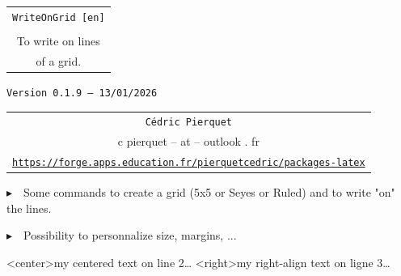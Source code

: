\documentclass[a4paper]{article}
\def\TPversion{0.1.9}
\def\TPdate{13/01/2026}
\begin{document}
\pagestyle{fancy}

\thispagestyle{empty}

\vspace{2cm}

\begin{center}
	\begin{minipage}{0.75\linewidth}
	\begin{tcolorbox}[colframe=yellow,colback=yellow!15]
		\begin{center}
			\begin{tabular}{c}
				{\Huge \texttt{WriteOnGrid [en]}}\\
				\\
				{\LARGE To write on lines} \\
				{\LARGE of a grid.}
			\end{tabular}
			
			\medskip
			
			{\small \texttt{Version \TPversion{} -- \TPdate}}
		\end{center}
	\end{tcolorbox}
\end{minipage}
\end{center}

\vspace{0.5cm}

\begin{center}
	\begin{tabular}{c}
	\texttt{Cédric Pierquet}\\
	{\ttfamily c pierquet -- at -- outlook . fr}\\
	\texttt{\url{https://forge.apps.education.fr/pierquetcedric/packages-latex}}
\end{tabular}
\end{center}

\vspace{0.5cm}

{$\blacktriangleright$~~Some commands to create a grid (5x5 or Seyes or Ruled) and to write "on" the lines.}

\smallskip

{$\blacktriangleright$~~Possibility to personnalize size, margins, ...}

\vspace{1cm}

\begin{center}
	\begin{EnvGrid}[NumSquares=22x8]
	\WriteLine<center>{my centered text on line 2\ldots}
	\WriteLine<right>{my right-align text on ligne 3\ldots}
	\PassLine
\end{EnvGrid}
\end{center}
\end{document}
